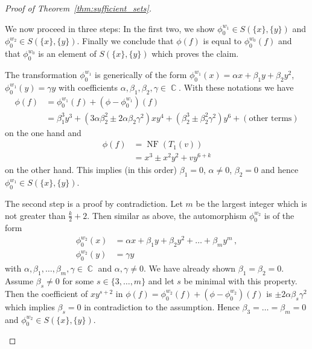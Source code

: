 \documentclass[noend]{amsproc}
\theoremstyle{definition}
\DeclareMathOperator{\C}{\mathbb{C}}
\DeclareMathOperator{\NF}{NF}
\begin{document}
\begin{proof}[Proof of Theorem~\ref{thm:sufficient_sets}]
\begin{description}[font=\normalfont\itshape,%
leftmargin=0cm,labelindent=\parindent]
We now proceed in three steps: In the first two, we show
$\phi_0^{w_1} \in S(\{x\}, \{y\})$ and $\phi_0^{w_2} \in S(\{x\}, \{y\})$.
Finally we conclude that $\phi(f)$ is equal to $\phi_0^{w_0}(f)$ and that
$\phi_0^{w_0}$ is an element of $S(\{x\}, \{y\})$ which proves the claim.

The transformation $\phi_0^{w_1}$ is generically of the form
$\phi_0^{w_1}(x) = \alpha x + \beta_1 y + \beta_2 y^2$,
$\phi_0^{w_1}(y) = \gamma y$ with coefficients
$\alpha, \beta_1, \beta_2, \gamma \in \C$. With these notations we have
\begin{align*}
\phi(f)
&= \phi_0^{w_1}(f) + (\phi-\phi_0^{w_1})(f) \\
&= \beta_1^3 y^3 + (3\alpha\beta_2^2 \pm 2\alpha\beta_2\gamma^2) xy^4
+ (\beta_2^3 \pm \beta_2^2\gamma^2) y^6 + (\text{other terms})
\end{align*}
on the one hand and
\begin{align*}
\phi(f)
&= \NF(T_1(v)) \\
&= x^3 \pm x^2 y^2 + vy^{6+k}
\end{align*}
on the other hand. This implies (in this order) $\beta_1 = 0$, $\alpha \neq 0$,
$\beta_2 = 0$ and hence $\phi_0^{w_1} \in S(\{x\}, \{y\})$.

The second step is a proof by contradiction. Let $m$ be the largest integer
which is not greater than $\frac{k}{2}+2$. Then similar as above, the
automorphism $\phi_0^{w_2}$ is of the form
\begin{align*}
\phi_0^{w_2}(x)
&= \alpha x + \beta_1 y + \beta_2 y^2 + \ldots + \beta_m y^m \,, \\
\phi_0^{w_2}(y) &= \gamma y
\end{align*}
with $\alpha, \beta_1, \ldots, \beta_m, \gamma \in \C$ and
$\alpha, \gamma \neq 0$. We have already shown $\beta_1 = \beta_2 = 0$. Assume
$\beta_s \neq 0$ for some $s \in \{3, \ldots, m\}$ and let $s$ be minimal with
this property. Then the coefficient of $xy^{s+2}$ in
$\phi(f) = \phi_0^{w_2}(f) + (\phi-\phi_0^{w_2})(f)$ is
$\pm 2\alpha\beta_s\gamma^2$ which implies $\beta_s = 0$ in contradiction to
the assumption. Hence $\beta_3 = \ldots = \beta_m = 0$ and
$\phi_0^{w_2} \in S(\{x\}, \{y\})$.


\end{description}
\end{proof}
\end{document}

